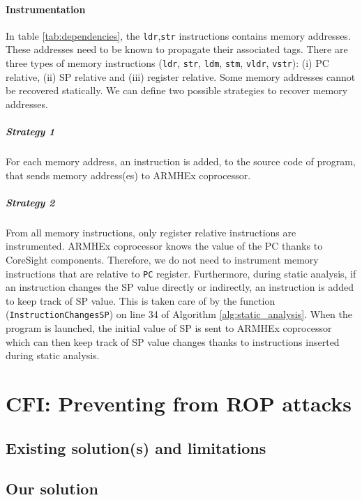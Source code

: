 \documentclass[10pt,a4paper, oneside]{memoir}
\begin{document}
\subsubsection{\textbf{Instrumentation}}

In table \ref{tab:dependencies}, the \texttt{ldr},\texttt{str} instructions contains memory addresses. These addresses need to be known to propagate their associated tags. There are three types of memory instructions (\texttt{ldr}, \texttt{str}, \texttt{ldm}, \texttt{stm}, \texttt{vldr}, \texttt{vstr}): (i) PC relative, (ii) SP relative and (iii) register relative. Some memory addresses cannot be recovered statically. We can define two possible strategies to recover memory addresses. 

\paragraph{Strategy 1}
For each memory address, an instruction is added, to the source code of program, that sends memory address(es) to ARMHEx coprocessor. 

\paragraph{Strategy 2}
From all memory instructions, only register relative instructions are instrumented. ARMHEx coprocessor knows the value of the PC thanks to CoreSight components. Therefore, we do not need to instrument memory instructions that are relative to \texttt{PC} register. Furthermore, during static analysis, if an instruction changes the SP value directly or indirectly, an instruction is added to keep track of SP value. This is taken care of by the function (\texttt{InstructionChangesSP}) on line 34 of Algorithm \ref{alg:static_analysis}. When the program is launched, the initial value of SP is sent to ARMHEx coprocessor which can then keep track of SP value changes thanks to instructions inserted during static analysis. 


\chapter{CFI: Preventing from ROP attacks}
\label{chap:CFI}
\section{Existing solution(s) and limitations}
\section{Our solution}
\end{document}
